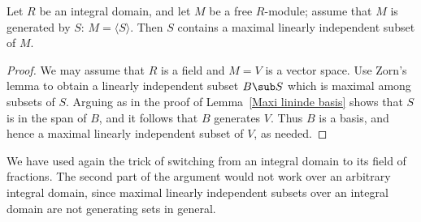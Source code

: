\begin{proposition}
Let $R$ be an integral domain, and let $M$ be a free $R$-module; assume that $M$ is generated by $S$: $M=\langle S\rangle$. Then $S$ contains a maximal linearly independent subset of $M$.
\end{proposition}
\begin{proof}
We may assume that $R$ is a field and $M=V$ is a vector space. Use Zorn's lemma to obtain a linearly independent subset $B\sub S$ which is maximal among subsets of $S$. Arguing as in the proof of Lemma~\ref{Maxi lininde basis} shows that $S$ is in the span of $B$, and it follows that $B$ generates $V$. Thus $B$ is a basis, and hence a maximal linearly independent subset of $V$, as needed.
\end{proof}
\begin{remark}
We have used again the trick of switching from an integral domain to its field of fractions. The second part of the argument would not work over an arbitrary integral domain, since maximal linearly independent subsets over an integral domain are not generating sets in general.
\end{remark}
\vspace{5mm}
